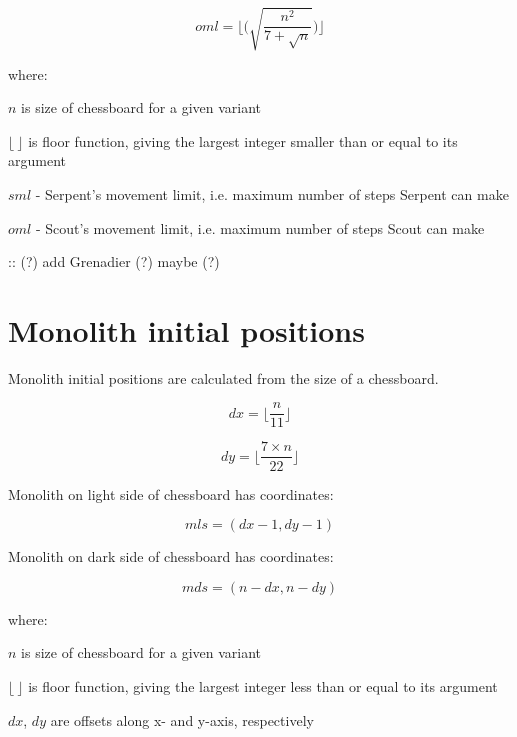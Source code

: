 \begin{equation}
oml = \lfloor \bigg( \sqrt{ \frac{n^2}{7 + \sqrt{n}} } \bigg) \rfloor
\end{equation}

where:

$n$ is size of chessboard for a given variant

$\lfloor\ \rfloor$ is floor function, giving the largest integer smaller than
or equal to its argument

$sml$ - Serpent's movement limit, i.e. maximum number of steps Serpent can make

$oml$ - Scout's movement limit, i.e. maximum number of steps Scout can make

\TODO :: (?) add Grenadier (?) maybe (?)

\clearpage %

\section*{Monolith initial positions}
\label{sec:Definitions/Monolith initial positions}

Monolith initial positions are calculated from the size of a chessboard.

\begin{equation}
dx = \lfloor \frac{n}{11} \rfloor
\end{equation}

\begin{equation}
dy = \lfloor \frac{7 \times n}{22} \rfloor
\end{equation}

Monolith on light side of chessboard has coordinates:

\begin{equation}
mls = (dx - 1, dy - 1)
\end{equation}

Monolith on dark side of chessboard has coordinates:

\begin{equation}
mds = (n - dx, n - dy)
\end{equation}

where:

$n$ is size of chessboard for a given variant

$\lfloor\ \rfloor$ is floor function, giving the largest integer less than or equal to its argument

$dx$, $dy$ are offsets along x- and y-axis, respectively

